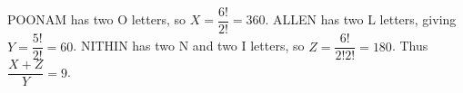 POONAM has two O letters, so $X=\dfrac{6!}{2!}=360$. ALLEN has two L letters, giving $Y=\dfrac{5!}{2!}=60$. NITHIN has two N and two I letters, so $Z=\dfrac{6!}{2!2!}=180$. Thus $\dfrac{X+Z}{Y}=\boxed9$.
